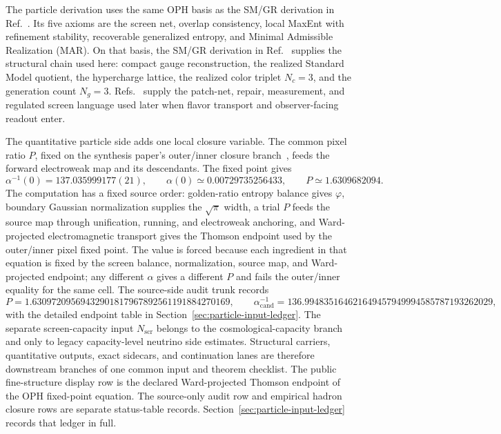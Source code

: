 \documentclass[11pt]{article}
\begin{document}
The particle derivation uses the same OPH basis as the SM/GR derivation in Ref.~\cite{ophcompact}. Its five
axioms are the screen net, overlap consistency, local MaxEnt with refinement stability,
recoverable generalized entropy, and Minimal Admissible Realization (MAR). On that basis, the
SM/GR derivation in Ref.~\cite{ophcompact} supplies the structural chain used here: compact gauge reconstruction, the realized
Standard Model quotient, the hypercharge lattice, the realized color triplet \(N_c=3\), and the generation count \(N_g=3\).
Refs.~\cite{ophconsensus,ophmicrophysics} supply the patch-net, repair, measurement, and
regulated screen language used later when flavor transport and observer-facing readout enter.

The quantitative particle side adds one local closure variable. The common pixel ratio \(P\),
fixed on the synthesis paper's outer/inner closure branch~\cite{ophsynthesis}, feeds the forward
electroweak map and its descendants. The fixed point gives
\[
\alpha^{-1}(0)=137.035999177(21),
\qquad
\alpha(0)\simeq0.00729735256433,
\qquad
P\simeq1.6309682094.
\]
The computation has a fixed source order: golden-ratio entropy balance gives
\(\varphi\), boundary Gaussian normalization supplies the \(\sqrt{\pi}\) width,
a trial \(P\) feeds the source map through unification, running, and electroweak
anchoring, and Ward-projected electromagnetic transport gives the Thomson
endpoint used by the outer/inner pixel fixed point.
The value is forced because each ingredient in that equation is fixed by the
screen balance, normalization, source map, and Ward-projected endpoint; any
different \(\alpha\) gives a different \(P\) and fails the outer/inner equality
for the same cell.
The source-side audit trunk records
\[
P=1.63097209569432901817967892561191884270169,
\qquad
\alpha_{\mathrm{cand}}^{-1}=136.994835164621649457949994585787193262029,
\]
with the detailed endpoint table in Section~\ref{sec:particle-input-ledger}. The separate
screen-capacity input \(N_{\mathrm{scr}}\) belongs to the cosmological-capacity branch and
only to legacy capacity-level neutrino side estimates. Structural carriers, quantitative outputs,
exact sidecars, and continuation lanes are therefore downstream branches of one common input and theorem
checklist. The public fine-structure display row is the declared Ward-projected Thomson endpoint
of the OPH fixed-point equation. The source-only audit row and empirical hadron closure rows are
separate status-table records.
Section~\ref{sec:particle-input-ledger}
records that ledger in full.
\end{document}
